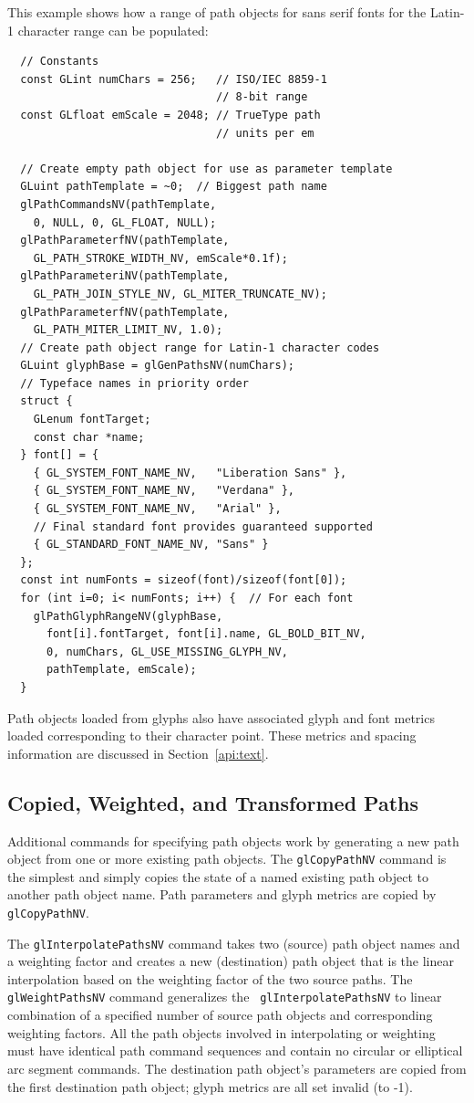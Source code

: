 This example shows how a range of path objects for sans serif fonts for
the Latin-1 character range can be populated:
\begin{lstlisting}
  // Constants
  const GLint numChars = 256;   // ISO/IEC 8859-1
                                // 8-bit range
  const GLfloat emScale = 2048; // TrueType path
                                // units per em
  
  // Create empty path object for use as parameter template
  GLuint pathTemplate = ~0;  // Biggest path name
  glPathCommandsNV(pathTemplate,
    0, NULL, 0, GL_FLOAT, NULL);
  glPathParameterfNV(pathTemplate,
    GL_PATH_STROKE_WIDTH_NV, emScale*0.1f);
  glPathParameteriNV(pathTemplate,
    GL_PATH_JOIN_STYLE_NV, GL_MITER_TRUNCATE_NV);
  glPathParameterfNV(pathTemplate,
    GL_PATH_MITER_LIMIT_NV, 1.0);
  // Create path object range for Latin-1 character codes
  GLuint glyphBase = glGenPathsNV(numChars);
  // Typeface names in priority order 
  struct {
    GLenum fontTarget;
    const char *name;
  } font[] = {
    { GL_SYSTEM_FONT_NAME_NV,   "Liberation Sans" },
    { GL_SYSTEM_FONT_NAME_NV,   "Verdana" },
    { GL_SYSTEM_FONT_NAME_NV,   "Arial" },
    // Final standard font provides guaranteed supported
    { GL_STANDARD_FONT_NAME_NV, "Sans" }
  };
  const int numFonts = sizeof(font)/sizeof(font[0]);
  for (int i=0; i< numFonts; i++) {  // For each font
    glPathGlyphRangeNV(glyphBase, 
      font[i].fontTarget, font[i].name, GL_BOLD_BIT_NV,
      0, numChars, GL_USE_MISSING_GLYPH_NV,
      pathTemplate, emScale);
  }
\end{lstlisting}
Path objects loaded from glyphs also have associated glyph and font
metrics loaded corresponding to their character point.  These metrics
and spacing information are discussed in Section~\ref{api:text}.

\subsection{Copied, Weighted, and Transformed Paths}

Additional commands for specifying path objects work by generating a new
path object from one or more existing path objects.  The {\tt glCopyPathNV}
command is the simplest and simply copies the state of a named existing
path object to another path object name.  Path parameters and glyph
metrics are copied by {\tt glCopyPathNV}.

The {\tt glInterpolatePathsNV} command takes two (source) path object names
and a weighting factor and creates a new (destination) path object
that is the linear interpolation based on the weighting factor of the
two source paths.  The {\tt glWeightPathsNV} command generalizes the {\tt
glInterpolatePathsNV} to linear combination of a specified number of source
path objects and corresponding weighting factors.  All the path objects
involved in interpolating or weighting must have identical path command
sequences and contain no circular or elliptical arc segment commands.
The destination path object's parameters are copied from the first
destination path object; glyph metrics are all set invalid (to -1).

